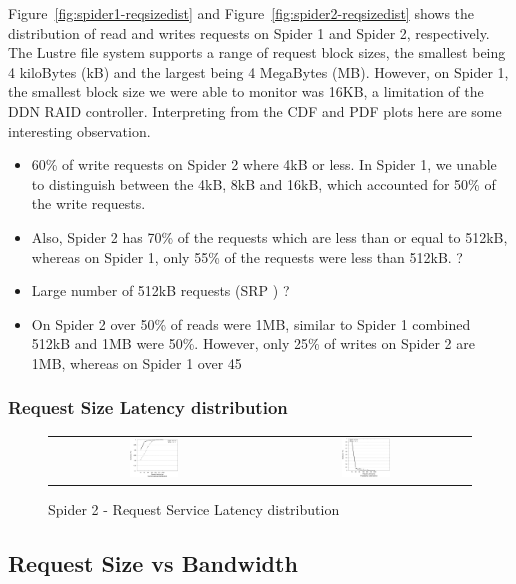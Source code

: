 Figure~\ref{fig:spider1-reqsizedist} and Figure~\ref{fig:spider2-reqsizedist} shows
the distribution of read and writes requests on Spider 1
and Spider 2, respectively. The Lustre file system supports a range of request
block sizes, the smallest being 4 kiloBytes (kB) and the largest being 4
MegaBytes (MB).  However, on Spider 1, the smallest block size we were able to
monitor was 16KB, a limitation of the DDN RAID controller. Interpreting from
the CDF and PDF plots here are some interesting observation.

\begin{itemize}

\item  60\% of write requests on Spider 2 where 4kB or less.  In Spider 1, we
unable to distinguish between the 4kB, 8kB and 16kB, which accounted for 50\% of
the write requests.
\item  Also, Spider 2 has 70\% of the requests which are less than or equal to
512kB, whereas on Spider 1, only 55\% of the requests were less than 512kB. ?  
\item   Large number of 512kB requests (SRP ) ?
\item On Spider 2 over 50\% of reads were 1MB, similar to Spider 1 combined
512kB and 1MB were 50\%. However, only 25\% of writes on Spider 2 are 1MB,
whereas on Spider 1 over 45%

\end{itemize}


\subsubsection{Request Size Latency distribution}

\begin{figure}[!t]
\centering
\begin{tabular}{cc}
{\includegraphics[width=0.24\textwidth]{./figs/spider2-reqLatCDF.eps}}&
{\includegraphics[width=0.24\textwidth]{./figs/spider2-reqLatPDF.eps}}\\
\end{tabular}
\vspace{-0.1in}
\centering
\caption{Spider 2 - Request Service Latency distribution}
\label{fig:spider1-reqLat}
\end{figure}




\subsection{Request Size vs Bandwidth}

 
